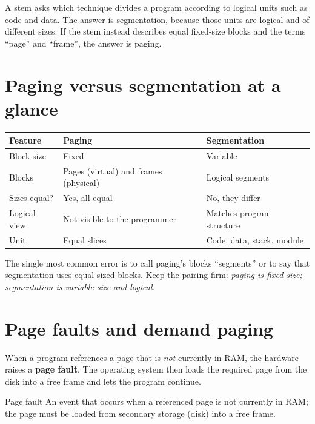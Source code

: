 \begin{example}
A stem asks which technique divides a program according to logical units such as
code and data. The answer is segmentation, because those units are logical and
of different sizes. If the stem instead describes equal fixed-size blocks and
the terms ``page'' and ``frame'', the answer is paging.
\end{example}

\section{Paging versus segmentation at a glance}
\begin{center}
\begin{tabular}{p{}p{}p{}}
\toprule
\textbf{Feature} & \textbf{Paging} & \textbf{Segmentation}\\
\midrule
Block size & Fixed & Variable\\
Blocks & Pages (virtual) and frames (physical) & Logical segments\\
Sizes equal? & Yes, all equal & No, they differ\\
Logical view & Not visible to the programmer & Matches program structure\\
Unit & Equal slices & Code, data, stack, module\\
\bottomrule
\end{tabular}
\end{center}

The single most common error is to call paging's blocks ``segments'' or to say
that segmentation uses equal-sized blocks. Keep the pairing firm:
\textit{paging is fixed-size; segmentation is variable-size and logical}.

\section{Page faults and demand paging}
When a program references a page that is \emph{not} currently in RAM, the
hardware raises a \textbf{page fault}. The operating system then loads the
required page from the disk into a free frame and lets the program continue.

\begin{definitionbox}{Page fault}
An event that occurs when a referenced page is not currently in RAM; the page
must be loaded from secondary storage (disk) into a free frame.
\end{definitionbox}

